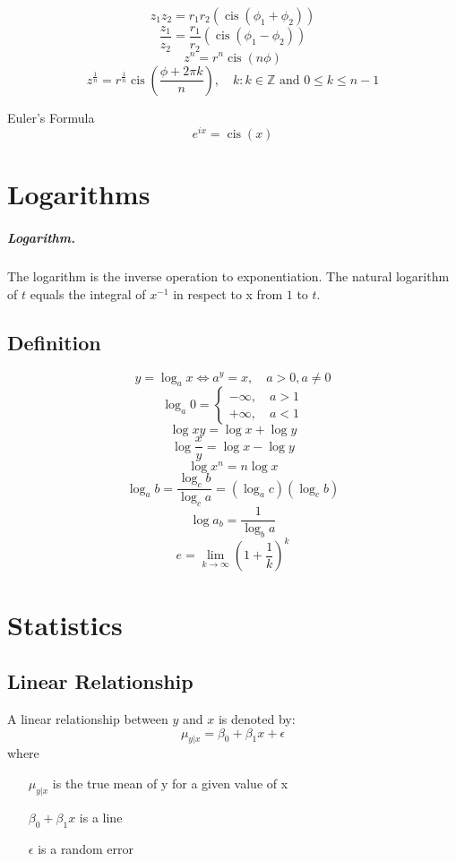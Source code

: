 \documentclass[oneside]{book} %
\theoremstyle{plain}
\DeclareMathOperator\cis{cis} %
\newcommand*\reciprocal[1]{\frac{1}{#1}}
\newcommand*\argument{\phi}
\newcommand*\integers{\mathbb{Z}}
\begin{document}
\[z_1 z_2 = r_1 r_2 \left ( \cis \left ( \phi_1 + \phi_2 \right ) \right )\]
\[\frac{z_1}{z_2} = \frac{r_1}{r_2} \left ( \cis \left ( \phi_1 - \phi_2 \right
) \right )\]
\[z^n = r^n \cis \left ( n \argument \right )\]
\[z^{\reciprocal{n}} = r^{\reciprocal{n}} \cis \left ( \frac{\argument + 2 \pi
k}{n} \right ), \quad
k : k \in \integers \text{ and } 0 \le k \le n - 1\]

Euler's Formula
\[e^{ix} = \cis \left ( x \right)\]

\chapter{Logarithms}

\paragraph{Logarithm.} The logarithm is the inverse operation to exponentiation.
The natural logarithm of \(t\) equals the integral of \(x^{-1}\) in respect to x
from \(1\) to \(t\).

\section{Definition}

\[y = \log_a x \iff a^y = x, \quad a > 0, a \ne 0\]
\[\log_a 0 = \begin{cases} -\infty, \quad a > 1 \\ +\infty, \quad a < 1
\end{cases}\]
\[\log x y = \log x + \log y\]
\[\log \frac{x}{y} = \log x - \log y\]
\[\log x^n = n \log x\]
\[\log_a b = \frac{\log_c b}{\log_c a} = \left ( \log_a c \right ) \left (
\log_c b \right )\]
\[\log a_b = \reciprocal{\log_b a}\]
\[e=\lim_{k\to\infty} \left ( 1 + \reciprocal{k} \right ) ^ k\]

\chapter{Statistics}

\section{Linear Relationship}
A linear relationship between \(y\) and \(x\) is denoted by:
\[\mu_{y | x} = \beta_0 + \beta_1 x + \epsilon\]
where
\begin{itemize}
  \item[\(\mu_{y | x}\)] is the true mean of y for a given value of x
  \item[\(\beta_0 + \beta_1 x\)] is a line
  \item[\(\epsilon\)] is a random error
\end{itemize}
\end{document}
